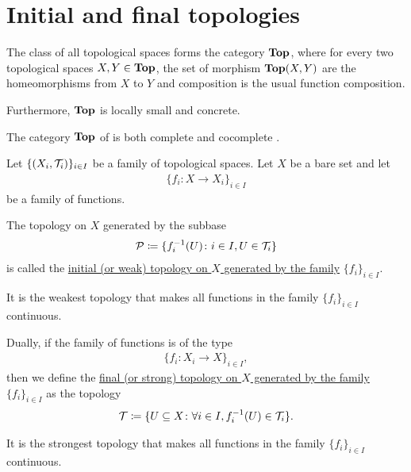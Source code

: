 \section{Initial and final topologies}\label{sec:initial_final_topologies}

\begin{definition}\label{def:category_of_topological_spaces}
  The class of all topological spaces forms the category $\operatorname{\mathbf{Top}}$, where for every two topological spaces $X, Y \in \operatorname{\mathbf{Top}}$, the set of morphism $\operatorname{\mathbf{Top}}(X, Y)$ are the homeomorphisms from $X$ to $Y$ and composition is the usual function composition.

  Furthermore, $\operatorname{\mathbf{Top}}$ is locally small and concrete.
\end{definition}

\begin{theorem}\label{thm:top_complete_cocomplete}
  The category $\operatorname{\mathbf{Top}}$ of is both complete  and cocomplete .
\end{theorem}

\begin{definition}\label{def:initial_topology}\cite{nLab:top}
  Let $\{ (X_i, \mathcal T_i) \}_{i \in I}$ be a family of topological spaces. Let $X$ be a bare set and let
  \begin{align*}
    \{ f_i: X \to X_i \}_{i \in I}
  \end{align*}
  be a family of functions.

  The topology on $X$ generated by the subbase
  \begin{align*}
    \mathcal P \coloneqq \{ f_i^{-1}(U) \colon i \in I, U \in \mathcal T_i \}
  \end{align*}
  is called the \ul{initial (or weak) topology on $X$ generated by the family} $\{ f_i \}_{i \in I}$.

  It is the weakest topology that makes all functions in the family $\{ f_i \}_{i \in I}$ continuous.
\end{definition}

\begin{definition}\label{def:final_topology}\cite{nLab:top}
  Dually, if the family of functions is of the type
  \begin{align*}
    \{ f_i: X_i \to X \}_{i \in I},
  \end{align*}
  then we define the \ul{final (or strong) topology on $X$ generated by the family} $\{ f_i \}_{i \in I}$ as the topology
  \begin{align*}
    \mathcal T \coloneqq \{ U \subseteq X \colon \forall i \in I, f_i^{-1}(U) \in \mathcal T_i \}.
  \end{align*}

  It is the strongest topology that makes all functions in the family $\{ f_i \}_{i \in I}$ continuous.
\end{definition}


